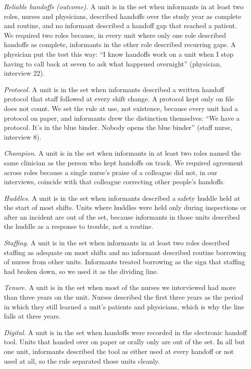 \documentclass[12pt]{article}
\begin{document}
\textit{Reliable handoffs (outcome).} A unit is in the set when informants in at least two roles, nurses and physicians, described handoffs over the study year as complete and routine, and no informant described a handoff gap that reached a patient. We required two roles because, in every unit where only one role described handoffs as complete, informants in the other role described recurring gaps. A physician put the test this way: ``I know handoffs work on a unit when I stop having to call back at seven to ask what happened overnight'' (physician, interview 22).

\textit{Protocol.} A unit is in the set when informants described a written handoff protocol that staff followed at every shift change. A protocol kept only on file does not count. We set the rule at use, not existence, because every unit had a protocol on paper, and informants drew the distinction themselves: ``We have a protocol. It's in the blue binder. Nobody opens the blue binder'' (staff nurse, interview 8).

\textit{Champion.} A unit is in the set when informants in at least two roles named the same clinician as the person who kept handoffs on track. We required agreement across roles because a single nurse's praise of a colleague did not, in our interviews, coincide with that colleague correcting other people's handoffs.

\textit{Huddles.} A unit is in the set when informants described a safety huddle held at the start of most shifts. Units where huddles were held only during inspections or after an incident are out of the set, because informants in those units described the huddle as a response to trouble, not a routine.

\textit{Staffing.} A unit is in the set when informants in at least two roles described staffing as adequate on most shifts and no informant described routine borrowing of nurses from other units. Informants treated borrowing as the sign that staffing had broken down, so we used it as the dividing line.

\textit{Tenure.} A unit is in the set when most of the nurses we interviewed had more than three years on the unit. Nurses described the first three years as the period in which they still learned a unit's patients and physicians, which is why the line falls at three years.

\textit{Digital.} A unit is in the set when handoffs were recorded in the electronic handoff tool. Units that handed over on paper or orally only are out of the set. In all but one unit, informants described the tool as either used at every handoff or not used at all, so the rule separated those units cleanly.
\end{document}
